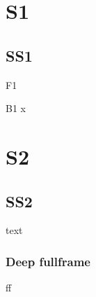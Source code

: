 \documentclass[presentation]{beamer}
\author{root}
\date{\today}
\title{}
\begin{document}
\section*{S1}
\label{sec:org56abb67}
\subsection*{SS1}
\label{sec:org195a6af}
\begin{frame}[label={sec:orgd9b238f}]{F1}
\begin{block}{B1}
x
\end{block}
\end{frame}
\section*{S2}
\label{sec:org204a845}
\subsection*{SS2}
\label{sec:org8f914bd}
text
\subsubsection*{Deep fullframe}
\label{sec:org95adfc0}
\begin{frame}[label={sec:org9057fbc}]{}
ff
\end{frame}
\end{document}
